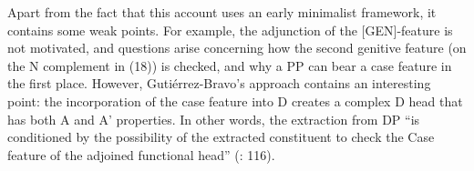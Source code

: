 \documentclass[output=paper]{langsci/langscibook}
\begin{document}
\begin{exe}\nopagebreak\ex%
\label{ex:mensch:18}%
%
\end{exe}

Apart from the fact that this account uses an early minimalist framework, it contains some weak points. For example, the adjunction of the [GEN]-feature is not motivated, and questions arise concerning how the second genitive feature (on the N complement in (18)) is checked, and why a PP can bear a case feature in the first place. However, Gutiérrez-Bravo’s approach contains an interesting point: the incorporation of the case feature into D creates a complex D head that has both A and A’ properties. In other words, the extraction from DP “is conditioned by the possibility of the extracted constituent to check the Case feature of the adjoined functional head” (\citealt{Gutiérrez-Bravo2001}: 116).
\end{document}
